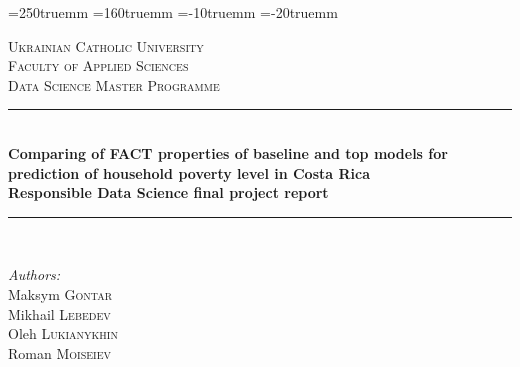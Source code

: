 \textheight=250truemm \textwidth=160truemm 
\hoffset=-10truemm \voffset=-20truemm



\begin{titlepage}

\newcommand{\HRule}{\rule{\linewidth}{0.5mm}} %

\center %
 

\textsc{\LARGE Ukrainian Catholic University}\\[1cm] %
\textsc{\Large  Faculty of Applied Sciences}\\[0.5cm] %
\textsc{\large Data Science Master Programme}\\[0.5cm] %

\vspace*{1cm}

\HRule \\[0.4cm]
{\Large \bfseries Comparing of FACT properties of baseline and top models for prediction of household poverty level in  Costa Rica}\\[10pt]
{\large \bfseries Responsible Data Science final project report}\\[0.4cm] %
\HRule \\[1cm]
 
\vspace*{1cm}
 
\Large \emph{Authors:}\\
Maksym \textsc{Gontar}\\
Mikhail \textsc{Lebedev}\\
Oleh \textsc{Lukianykhin}\\
Roman \textsc{Moiseiev}\\[1cm] %


\end{titlepage}
